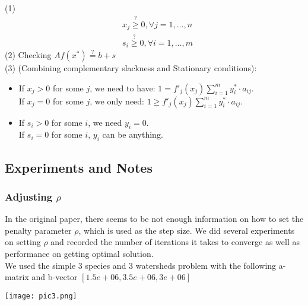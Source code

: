 \documentclass{article}
\begin{document}
\begin{itemize}
(1)
\begin{align*} &x_j\stackrel{?}{\ge} 0,\forall j=1,\ldots,n \\
& s_i\stackrel{?}{\ge} 0,\forall i=1,\ldots,m
\end{align*}
(2) Checking $Af(x^*) \stackrel{?}{=} b + s$\\
(3) (Combining complementary slackness and Stationary conditions): 
\begin{itemize}
    \item If $x_j > 0$ for some $j$, we need to have: $1 = f'_j(x_j) \sum\limits_{i=1}^m y_i^* \cdot a_{ij}$.\\
    If $x_j = 0$ for some $j$, we only need: $1 \ge f'_j(x_j) \sum\limits_{i=1}^m y_i^* \cdot a_{ij}$.
    \item If $s_i > 0$ for some $i$, we need $y_i = 0$.\\
    If $s_i = 0$ for some $i$, $y_i$ can be anything.
    
\end{itemize}



\end{itemize}

\subsection{Experiments and Notes}

\subsubsection{Adjusting $\rho$}
In the original paper, there seems to be not enough information on how to set the penalty parameter $\rho$, which is used as the step size. We did several experiments on setting $\rho$ and recorded the number of iterations it takes to converge as well as performance on getting optimal solution. \\
We used the simple 3 species and 3 watersheds problem with the following a-matrix and b-vector $[1.5e+06, 3.5e+06, 3e+06]$

\texttt{[image: pic3.png]}
\end{document}
